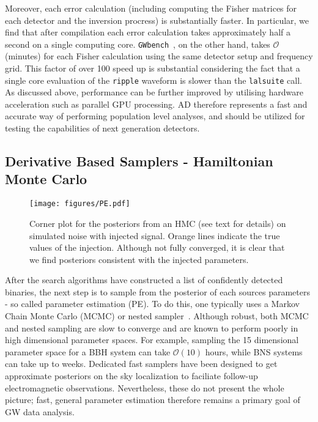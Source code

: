 \documentclass[twocolumn]{aastex631}
\newcommand{\ripple}{\texttt{ripple}\xspace}
\newcommand{\lalsuite}{\texttt{lalsuite}\xspace}
\begin{document}
Moreover, each error calculation (including computing the Fisher matrices for each detector and the inversion procress) is substantially faster.
In particular, we find that after compilation each error calculation takes approximately half a second on a single computing core.
\texttt{GWbench}~\citep{Borhanian:2020ypi}, on the other hand, takes $\mathcal{O}$(minutes) for each Fisher calculation using the same detector setup and frequency grid.
This factor of over 100 speed up is substantial considering the fact that a single core evaluation of the \ripple waveform is slower than the \lalsuite call.
As discussed above, performance can be further improved by utilising hardware acceleration such as parallel GPU processing.
AD therefore represents a fast and accurate way of performing population level analyses, and should be utilized for testing the capabilities of next generation detectors.

\subsection{Derivative Based Samplers - Hamiltonian Monte Carlo}
\label{subsec:hmc}

\begin{figure*}[t]
    \centering
    \texttt{[image: figures/PE.pdf]}
    \caption{
        Corner plot for the posteriors from an HMC (see text for details) on simulated noise with injected signal. 
        Orange lines indicate the true values of the injection. 
        Although not fully converged, it is clear that we find posteriors consistent with the injected parameters. 
    }
    \label{fig:corner}
\end{figure*}

After the search algorithms have constructed a list of confidently detected binaries, the next step is to sample from the posterior of each sources parameters - so called parameter estimation (PE).
To do this, one typically uses a Markov Chain Monte Carlo (MCMC) or nested sampler~\citep{multinest, dynesty}.
Although robust, both MCMC and nested sampling are slow to converge and are known to perform poorly in high dimensional parameter spaces.
For example, sampling the 15 dimensional parameter space for a BBH system can take $\mathcal{O}(10)$ hours, while BNS systems can take up to weeks.
Dedicated fast samplers have been designed to get approximate posteriors on the sky localization to faciliate follow-up electromagnetic observations.
Nevertheless, these do not present the whole picture; fast, general parameter estimation therefore remains a primary goal of GW data analysis.
\end{document}
